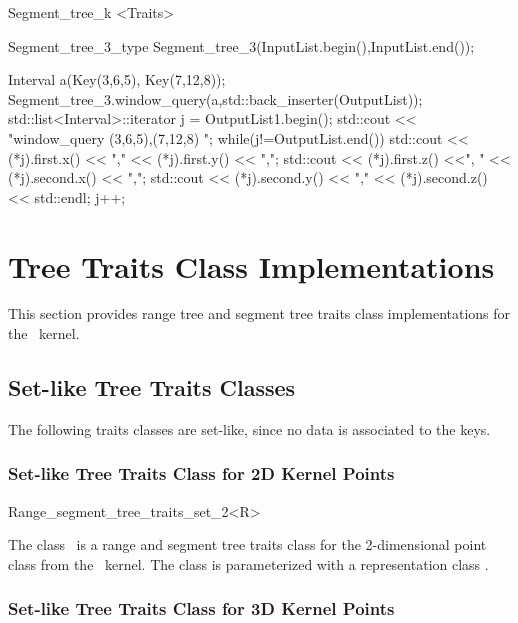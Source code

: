 \begin{ccClassTemplate}{Segment_tree_k
        <Traits>}
\begin{cprog}
{  Segment_tree_3_type Segment_tree_3(InputList.begin(),InputList.end());

  Interval a(Key(3,6,5), Key(7,12,8));
  Segment_tree_3.window_query(a,std::back_inserter(OutputList));
  std::list<Interval>::iterator j = OutputList1.begin();
  std::cout << "\n window_query (3,6,5),(7,12,8) \n";
  while(j!=OutputList.end()){
    std::cout << (*j).first.x() << "," << (*j).first.y() << ",";
    std::cout << (*j).first.z() <<", " << (*j).second.x() << ",";
    std::cout << (*j).second.y() << "," << (*j).second.z() << std::endl; 
    j++;
  }
}
\end{cprog}

\end{ccClassTemplate}


\section{Tree Traits Class Implementations  \label{RT::SectPredefined}}

This section provides range tree and segment tree traits class implementations for the
\cgal\ kernel.

\subsection{Set-like Tree Traits Classes}

The following traits classes are set-like, since no data is
associated to the keys.

\subsubsection{Set-like Tree Traits Class for 2D Kernel Points}

\begin{ccClassTemplate} {Range_segment_tree_traits_set_2<R>}

\ccDefinition
The class \ccClassName\ is a range and segment tree traits class for the
2-dimensional point class from the \cgal\ kernel. The class is
parameterized with a representation class .


\ccTypes
{}


\end{ccClassTemplate} 
\subsubsection{Set-like Tree Traits Class for 3D Kernel Points}

